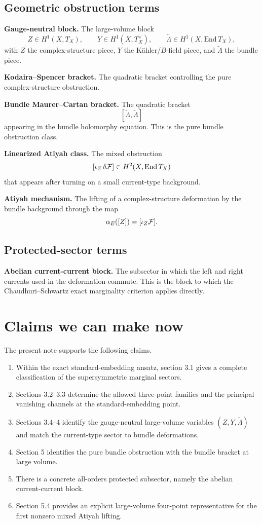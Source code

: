 \documentclass[11pt]{article}
\newcommand{\wt}[1]{\widetilde{#1}}
\begin{document}
\subsection*{Geometric obstruction terms}

\textbf{Gauge-neutral block.} The large-volume block
\[
Z\in H^1(X,T_X),\qquad
Y\in H^1(X,T_X^\vee),\qquad
\wt\Lambda\in H^1(X,\mathrm{End}\,T_X),
\]
with $Z$ the complex-structure piece, $Y$ the K\"ahler/$B$-field piece, and $\wt\Lambda$ the bundle piece.

\textbf{Kodaira--Spencer bracket.} The quadratic bracket controlling the pure complex-structure obstruction.

\textbf{Bundle Maurer--Cartan bracket.} The quadratic bracket
\[
[\wt\Lambda,\wt\Lambda]
\]
appearing in the bundle holomorphy equation. This is the pure bundle obstruction class.

\textbf{Linearized Atiyah class.} The mixed obstruction
\[
[\iota_Z\,\delta{\cal F}]\in H^2(X,\mathrm{End}\,T_X)
\]
that appears after turning on a small current-type background.

\textbf{Atiyah mechanism.} The lifting of a complex-structure deformation by the bundle background through the map
\[
\alpha_E([Z])=[\iota_Z{\cal F}].
\]

\subsection*{Protected-sector terms}

\textbf{Abelian current-current block.} The subsector in which the left and right currents used in the deformation commute. This is the block to which the Chaudhuri--Schwartz exact marginality criterion applies directly.

\section{Claims we can make now}

The present note supports the following claims.
\begin{enumerate}
\item Within the exact standard-embedding ansatz, section 3.1 gives a complete classification of the supersymmetric marginal sectors.
\item Sections 3.2--3.3 determine the allowed three-point families and the principal vanishing channels at the standard-embedding point.
\item Sections 3.4--4 identify the gauge-neutral large-volume variables $(Z,Y,\wt\Lambda)$ and match the current-type sector to bundle deformations.
\item Section 5 identifies the pure bundle obstruction with the bundle bracket at large volume.
\item There is a concrete all-orders protected subsector, namely the abelian current-current block.
\item Section 5.4 provides an explicit large-volume four-point representative for the first nonzero mixed Atiyah lifting.
\end{enumerate}
\end{document}
